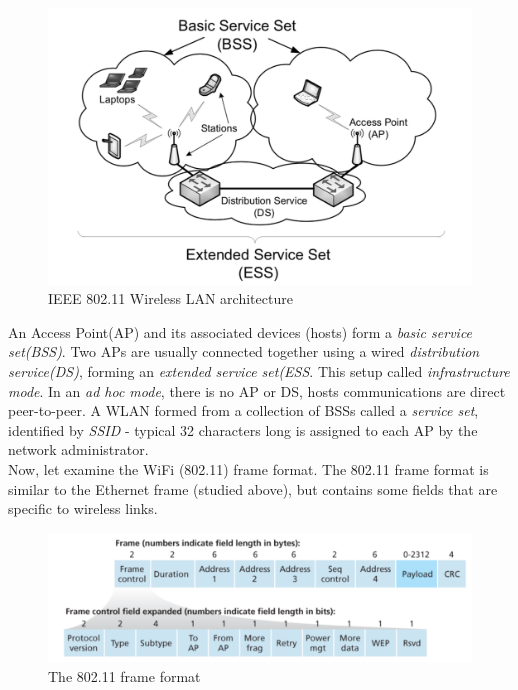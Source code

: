\documentclass[a4paper, 11pt]{article}
\begin{document}
\begin{figure}[h]
\includegraphics[scale=0.6]{80211-wireless-LAN-architecture.png}
\caption{IEEE 802.11 Wireless LAN architecture}
\label{fig:802.11-architecture}
\end{figure}

An Access Point(AP) and its associated devices (hosts) form a \textit{basic service set(BSS)}. Two APs are usually connected together using a wired \textit{distribution service(DS)}, forming an \textit{extended service set(ESS}. This setup called \textit{infrastructure mode}. In an \textit{ad hoc mode}, there is no AP or DS, hosts communications are direct peer-to-peer. A WLAN formed from a collection of BSSs called a \textit{service set}, identified by \textit{SSID} - typical 32 characters long is assigned to each AP by the network administrator.\\

Now, let examine the WiFi (802.11) frame format. The 802.11 frame format is similar to the Ethernet frame (studied above), but contains some fields that are specific to wireless links.\\

\begin{figure}[h]
\includegraphics[scale=0.6]{80211-frame-format.png}
\caption{The 802.11 frame format}
\label{fig:802.11-frame-format}
\end{figure}
\end{document}
